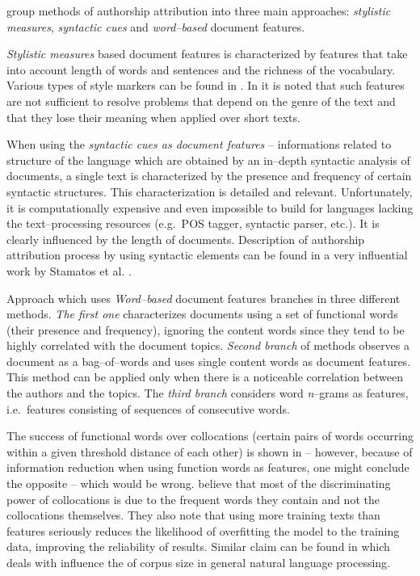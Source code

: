 \documentclass[11pt,english]{article}
\begin{document}
\begin{multicols}{2}
\citet{coyotl2006authorship} group methods of authorship attribution into three
main approaches: \emph{stylistic measures}, \emph{syntactic cues} and
\emph{word--based} document features.

\emph{Stylistic measures} based document features is characterized by features
that take into account length of words and sentences and the
richness of the vocabulary. Various types of style markers can be found in
\citep{luyckx2005shallow}. In \citep{coyotl2006authorship} it is noted that such features are not sufficient to resolve problems that depend on the genre of the text and that they lose their meaning when applied over short texts.

When using the \emph{syntactic cues as document features} -- informations
related to structure of the language which are obtained by an in--depth syntactic
analysis of documents, a single text is characterized by the presence and frequency of
certain syntactic structures. This characterization is detailed and relevant.
Unfortunately, it is computationally expensive and even impossible to build for
languages lacking the text--processing resources (e.g.\ POS tagger, syntactic
parser, etc.). It is clearly influenced by the length of documents. Description of authorship attribution process by using syntactic elements
can be found in a very influential work by Stamatos et al.
\citep{stamatatos2001computer}.

Approach which uses \emph{Word--based} document features branches in three
different methods. \emph{The first one} characterizes documents using a set of
functional words (their presence and frequency), ignoring the content words since
they tend to be highly correlated with the document topics. \emph{Second branch}
of methods observes a document as a bag--of--words and uses single content words as
document features. This method can be applied only when there is a noticeable
correlation between the authors and the topics. The \emph{third branch} considers
word \emph{n}--grams as features, i.e.\ features consisting of sequences of
consecutive words.

The success of functional words over collocations (certain pairs of words
occurring within a given threshold distance of each other) is shown in
\citep{argamon2005measuring} -- however, because of information reduction when 
using function words as features, one might conclude the opposite -- which would be
wrong. \citet{argamon2005measuring} believe that most of the discriminating power
of collocations is due to the frequent words they contain and not the
collocations themselves. They also note that using more training texts than
features seriously reduces the likelihood of overfitting the model to the
training data, improving the reliability of results. Similar claim can be found
in \citep{banko2001scaling} which deals with influence the of corpus size in
general natural language processing.


\end{multicols}
\end{document}
